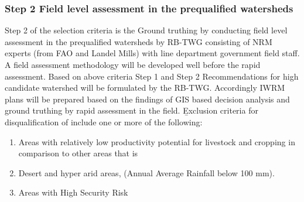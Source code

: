\subsubsection{Step 2 Field level assessment in the prequalified watersheds}
Step 2 of the selection criteria is the Ground truthing by conducting field level assessment in the prequalified watersheds by RB-TWG consisting of NRM experts (from FAO and Landel Mills) with line department government field staff. A field assessment methodology will be developed well before the rapid assessment.
Based on above criteria Step 1 and Step 2 Recommendations for high candidate watershed will be formulated by the RB-TWG. Accordingly IWRM plans will be prepared based on the findings of GIS based decision analysis and ground truthing by rapid assessment in the field.
\b{Exclusion criteria for disqualification of include one or more of the following: }
\begin{enumerate}
    \item Areas with relatively low productivity potential for livestock and cropping in comparison to other areas that is %
    \item Desert and hyper arid areas, (Annual Average Rainfall below 100 mm).
    \item Areas with High Security Risk

\end{enumerate}